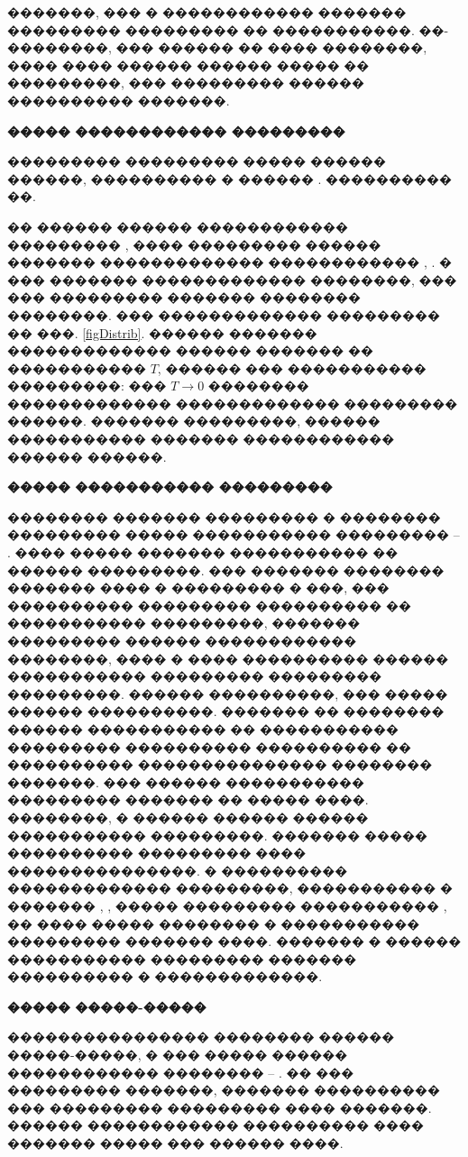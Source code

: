 \documentclass[12pt,titlepage]{article}
\begin{document}
�������, ��� � ������������ ������� ��������� ��������� �� �����������. ��-��������, ��� ������ �� ���� ��������, ���� ���� ������ ������ ����� �� ���������, ��� ��������� ������ ���������� �������.

\bigskip

\textbf{����� ������������ ���������}

��������� ��������� ����� ������ ������, ���������� � ������ \cite{Demura}. ���������� ��.

�� ������ ������ ������������ ��������� \cite{Bohm1952}, \cite{Bohm1953} ���� ��������� ������ ������� ������������� ������������ \cite{Broyles1955}, \cite{Broyles1958}. � ��� ������� ������������� ��������, ��� ��� ��������� ������� �������� ��������. ��� ������������� ��������� �� ���. \ref{figDistrib}. ������ ������� ������������� ������ ������� �� ����������� $T$, ������ ��� ����������� ���������: ��� $T \to 0$ �������� ������������� ������������� ��������� ������. ������� ���������, ������ ����������� ������� ������������ ������ ������.

\bigskip

\textbf{����� ����������� ���������}

�������� ������� ��������� � �������� ��������� ����� ����������� ��������� \cite{Dharma-Wardana1986} -- \cite{Kohn1999}. ���� ����� ������� ����������� �� ������ ���������. ��� ������� �������� ������� ���� � ��������� � ���, ��� ���������� ��������� ���������� �� ����������� ���������, ������� ��������� ������ ������������ ��������, ���� � ���� ���������� ������ ����������� ��������� ��������� ���������. ������ ����������, ��� ����� ������ ����������. ������� �� �������� ������ ����������� �� ����������� ��������� ���������� ���������� �� ���������� ��������������� �������� �������. ��� ������ ����������� ��������� ������� �� ����� ����. ��������, � ������ ������ ������ ����������� ���������. ������� ����� ���������� ��������� ���� ���������������. � ���������� ������������� ���������, ����������� � ������� \cite{Dharma-Wardana1986}, \cite{Dharma-Wardana1991}, ����� ��������� ����������� \cite{Demura}, �� ���� ����� �������� � ����������� ��������� ������� ����. ������� � ������ ����������� ��������� ������� ���������� � �������������.

\bigskip

\textbf{����� �����-�����}

���������������� �������� ������ �����-�����, � ��� ����� ������ ������������ �������� \cite{Gilles1986} -- \cite{Kamilov1999}. �� ��� ��������� �������, ������� ���������� ��� ��������� ��������� ���� �������. ������ ������������ ���������� ���� ������� ����� ��� ������ ����.
\end{document}
